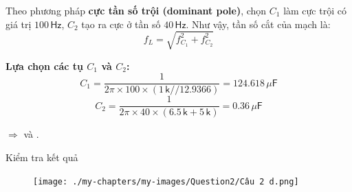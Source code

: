 Theo phương pháp \textbf{cực tần số trội (dominant pole)}, chọn $C_{1}$ làm cực trội có giá trị $100\,\textsf{Hz}$, 
$C_{2}$ tạo ra cực ở tần số $40\,\textsf{Hz}$.  
Như vậy, tần số cắt của mạch là:
\[
f_{L} = \sqrt{f_{C_{1}}^{2} + f_{C_{2}}^{2}}
\]

\textbf{Lựa chọn các tụ $C_{1}$ và $C_{2}$:}
\[
C_{1} = \frac{1}{2\pi \times 100 \times (1\,\textsf{k}//12.9366)}
= 124.618\,\mu\textsf{F}
\]
\[
C_{2} = \frac{1}{2\pi \times 40 \times (6.5\,\textsf{k} + 5\,\textsf{k})}
= 0.36\,\mu\textsf{F}
\]

$\Rightarrow$  và .

Kiểm tra kết quả

\begin{figure}[H]
	\centering
	\texttt{[image: ./my-chapters/my-images/Question2/Câu 2 d.png]}
\end{figure}
